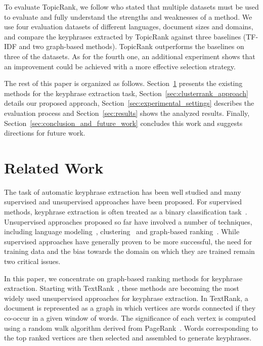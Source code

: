   To evaluate TopicRank, we follow  who stated
  that multiple datasets must be used to evaluate and fully understand the
  strengths and weaknesses of a method. We use four evaluation datasets of
  different languages, document sizes and domains, and compare the keyphrases
  extracted by TopicRank against three baselines (TF-IDF and two graph-based
  methods). TopicRank outperforms the baselines on three of the datasets. As for
  the fourth one, an additional experiment shows that an improvement could be
  achieved with a more effective selection strategy.

  The rest of this paper is organized as follows. Section~\ref{sec:related_work}
  presents the existing methods for the keyphrase extraction task,
  Section~\ref{sec:clusterrank_approach} details our proposed approach,
  Section~\ref{sec:experimental_settings} describes the evaluation process and
  Section~\ref{sec:results} shows the analyzed results. Finally,
  Section~\ref{sec:conclusion_and_future_work} concludes this work and suggests
  directions for future work.

\section{Related Work}
\label{sec:related_work}
  The task of automatic keyphrase extraction has been well studied and many
  supervised and unsupervised approaches have been proposed. For supervised
  methods, keyphrase extraction is often treated as a binary classification
  task~\cite{witten1999kea}. Unsupervised approaches proposed so far have
  involved a number of techniques, including language
  modeling~\cite{tomokiyo2003languagemodel},
  clustering~\cite{liu2009keycluster} and graph-based
  ranking~\cite{mihalcea2004textrank}. While supervised approaches have
  generally proven to be more successful, the need for training data and the
  bias towards the domain on which they are trained remain two critical issues.

  In this paper, we concentrate on graph-based ranking methods for keyphrase
  extraction. Starting with TextRank~\cite{mihalcea2004textrank}, these methods
  are becoming the most widely used unsupervised approaches for keyphrase
  extraction. In TextRank, a document is represented as a graph in which
  vertices are words connected if they co-occur in a given window of words. The
  significance of each vertex is computed using a random walk algorithm derived
  from PageRank~\cite{brin1998pagerank}. Words corresponding to the top ranked
  vertices are then selected and assembled to generate keyphrases.

